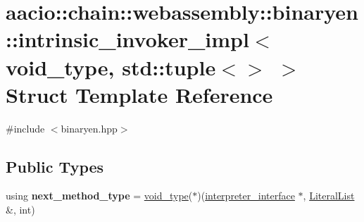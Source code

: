 \hypertarget{structaacio_1_1chain_1_1webassembly_1_1binaryen_1_1intrinsic__invoker__impl_3_01void__type_00_01std_1_1tuple_3_4_01_4}{}\section{aacio\+:\+:chain\+:\+:webassembly\+:\+:binaryen\+:\+:intrinsic\+\_\+invoker\+\_\+impl$<$ void\+\_\+type, std\+:\+:tuple$<$$>$ $>$ Struct Template Reference}
\label{structaacio_1_1chain_1_1webassembly_1_1binaryen_1_1intrinsic__invoker__impl_3_01void__type_00_01std_1_1tuple_3_4_01_4}


{\ttfamily \#include $<$binaryen.\+hpp$>$}

\subsection*{Public Types}
\begin{DoxyCompactItemize}
\item 
\mbox{\label{structaacio_1_1chain_1_1webassembly_1_1binaryen_1_1intrinsic__invoker__impl_3_01void__type_00_01std_1_1tuple_3_4_01_4_af594c501c1130577a6cf1fd09cddcc4b}} 
using {\bfseries next\+\_\+method\+\_\+type} = \mbox{\hyperlink{structaacio_1_1chain_1_1webassembly_1_1binaryen_1_1void__type}{void\+\_\+type}}($\ast$)(\mbox{\hyperlink{structaacio_1_1chain_1_1webassembly_1_1binaryen_1_1interpreter__interface}{interpreter\+\_\+interface}} $\ast$, \mbox{\hyperlink{classstd_1_1vector}{Literal\+List}} \&, int)
\end{DoxyCompactItemize}
